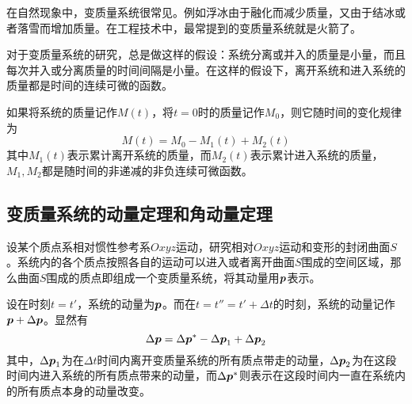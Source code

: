 在自然现象中，变质量系统很常见。例如浮冰由于融化而减少质量，又由于结冰或者落雪而增加质量。在工程技术中，最常提到的变质量系统就是火箭了。

对于变质量系统的研究，总是做这样的假设：系统分离或并入的质量是小量，而且每次并入或分离质量的时间间隔是小量。在这样的假设下，离开系统和进入系统的质量都是时间的连续可微的函数。

如果将系统的质量记作$M(t)$，将$t=0$时的质量记作$M_0$，则它随时间的变化规律为
\begin{equation}
	M(t) = M_0 - M_1(t) + M_2(t)
	\label{chapter1:变质量系统的质量关系}
\end{equation}
其中$M_1(t)$表示累计离开系统的质量，而$M_2(t)$表示累计进入系统的质量，$M_1,M_2$都是随时间的非递减的非负连续可微函数。

\subsection{变质量系统的动量定理和角动量定理}

设某个质点系相对惯性参考系$Oxyz$运动，研究相对$Oxyz$运动和变形的封闭曲面$S$。系统内的各个质点按照各自的运动可以进入或者离开曲面$S$围成的空间区域，那么曲面$S$围成的质点即组成一个变质量系统，将其动量用$\boldsymbol{p}$表示。

设在时刻$t=t'$，系统的动量为$\boldsymbol{p}$。而在$t=t''=t'+\Delta t$的时刻，系统的动量记作$\boldsymbol{p}+\Delta \boldsymbol{p}$。显然有
\begin{equation}
	\Delta \boldsymbol{p} = \Delta \boldsymbol{p}^*-\Delta \boldsymbol{p}_1+\Delta \boldsymbol{p}_2
	\label{chapter1:变质量系统的动量定理-初步}
\end{equation}
其中，$\Delta\boldsymbol{p}_1$为在$\Delta t$时间内离开变质量系统的所有质点带走的动量，$\Delta\boldsymbol{p}_2$为在这段时间内进入系统的所有质点带来的动量，而$\Delta\boldsymbol{p}^*$则表示在这段时间内一直在系统内的所有质点本身的动量改变。

